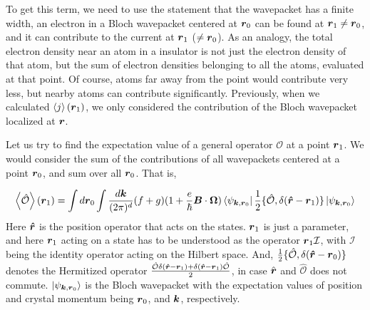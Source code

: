 \documentclass{report}
\renewcommand\vec[1]{\ensuremath\boldsymbol{#1}} %
\begin{document}
To get this term, we need to use the statement that the wavepacket has a finite width, an electron in a Bloch wavepacket centered at $\vec{r}_0$ can be found at $\vec{r}_1 \neq \vec{r}_0$, and it can contribute to the current at $\vec{r}_1$ ($\neq \vec{r}_0$). As an analogy, the total electron density near an atom in a insulator is not just the electron density of that atom, but the sum of electron densities belonging to all the atoms, evaluated at that point. Of course, atoms far away from the point would contribute very less, but nearby atoms can contribute significantly. Previously, when we calculated $\expval{j}(\vec{r}_1)$, we only considered the contribution of the  Bloch wavepacket localized at $\vec{r}$.

Let us try to find the expectation value of a general operator $\mathcal{O}$ at a point $\vec{r}_1$. We would consider the sum of the contributions of all wavepackets centered at a point $\vec{r}_0$, and sum over all $\vec{r}_0$. That is, \cite{XiaoElecPropertiesReview2010}

$$
	\expval{\hat{\mathcal{O}}}(\vec{r}_1) = \int d\vec{r}_0 \int  \frac{d\vec{k}}{(2\pi)^d} (f+g) (1+\frac{e}{\hbar} \vec{B}\cdot\vec{\Omega})
	\bra{\psi_{\vec{k},\vec{r}_0}} \frac{1}{2}\{\hat{\mathcal{O}}, \delta(\vec{\hat{r}} - \vec{r}_1)\} \ket{\psi_{\vec{k},\vec{r}_0}} 
$$
Here $\vec{\hat{r}}$ is the position operator that acts on the states. $\vec{r}_1$ is just a parameter, and here $\vec{r}_1$ acting on a state has to be understood as the operator $\vec{r}_1 \mathcal{I}$, with $\mathcal{I}$ being the identity operator acting on the Hilbert space. And,
$\frac{1}{2}\{\hat{\mathcal{O}}, \delta(\vec{\hat{r}} - \vec{r}_0)\}$ denotes the Hermitized operator $\frac{\hat{\mathcal{O}}  \delta(\vec{\hat{r}} - \vec{r}_1) + \delta(\vec{\hat{r}} - \vec{r}_1)\hat{\mathcal{O}}  }{2}$, in case $\hat{\vec{r}}$ and $\hat{\mathcal{O}}$ does not commute. $\ket{\psi_{\vec{k},\vec{r}_0}}$ is the Bloch wavepacket with the expectation values of position and crystal momentum being $\vec{r}_0$, and $\vec{k}$, respectively.
\end{document}
